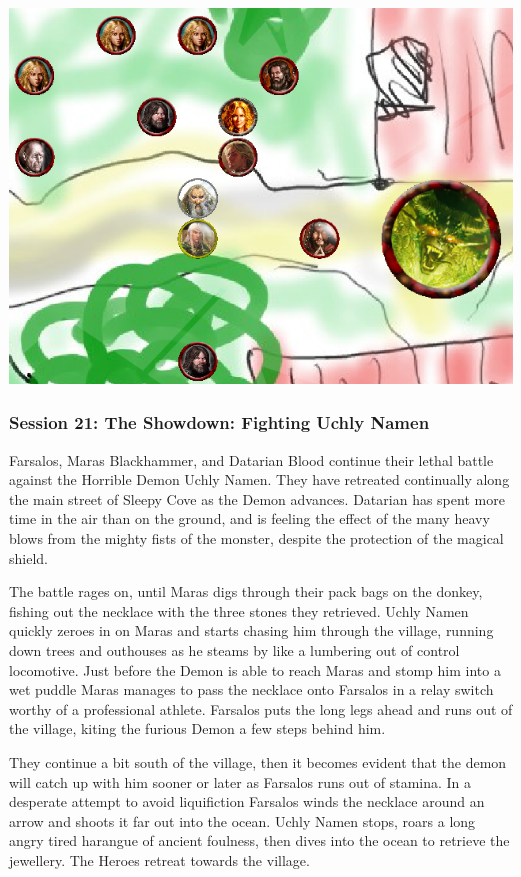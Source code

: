 \begin{center}
\vspace{0.5 cm}
\includegraphics[width=0.7\linewidth]{./figs/playthrough/battle-sleepy-cove.png}
\vspace{0.5 cm}
\end{center}


\subsubsection*{Session 21: The Showdown: Fighting Uchly Namen}
Farsalos, Maras Blackhammer, and Datarian Blood continue their lethal battle against the Horrible Demon Uchly Namen. They have retreated continually along the main street of Sleepy Cove as the Demon advances. Datarian has spent more time in the air than on the ground, and is feeling the effect of the many heavy blows from the mighty fists of the monster, despite the protection of the magical shield.

The battle rages on, until Maras digs through their pack bags on the donkey, fishing out the necklace with the three stones they retrieved. Uchly Namen quickly zeroes in on Maras and starts chasing him through the village, running down trees and outhouses as he steams by like a lumbering out of control locomotive. Just before the Demon is able to reach Maras and stomp him into a wet puddle Maras manages to pass the necklace onto Farsalos in a relay switch worthy of a professional athlete. Farsalos puts the long legs ahead and runs out of the village, kiting the furious Demon a few steps behind him.

They continue a bit south of the village, then it becomes evident that the demon will catch up with him sooner or later as Farsalos runs out of stamina. In a desperate attempt to avoid liquifiction Farsalos winds the necklace around an arrow and shoots it far out into the ocean. Uchly Namen stops, roars a long angry tired harangue of ancient foulness, then dives into the ocean to retrieve the jewellery. The Heroes retreat towards the village.

